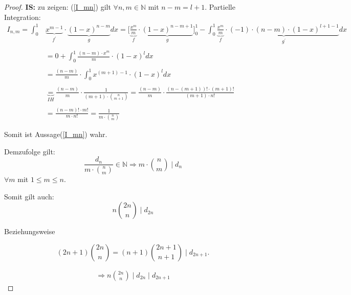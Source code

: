 \documentclass[12pt,oneside]{article}
\theoremstyle{remark}
\theoremstyle{definition}
\begin{document}
\begin{proof}
\textbf{IS:}
zu zeigen: (\ref{I_mn}) gilt $\forall n,m \in \mathbb{N}$ mit $ n - m = l + 1$.\newline\newline
Partielle Integration:\newline\newline
\begin{align*}
    I_{n,m} = \int_{0}^{1} &\underbrace{x^{m - 1}}_{f^{'}} \cdot \underbrace{(1 - x)^{n - m}}_{g} dx =\Big[ \underbrace{\frac{x^{m}}{m}}_{f} \cdot \underbrace{(1 - x)^{n - m + 1}}_{g}\Big]_0^1 - \int_{0}^{1} \underbrace{\frac{x^{m}}{m}}_{f} \cdot \underbrace{(-1 )\cdot (n - m) \cdot (1 -x)^{l + 1 - 1}}_{g^{'}} dx \\
    \\
    &= 0 +  \int_{0}^{1} \frac{(n - m) \cdot x^{m}}{m} \cdot (1 - x)^{l} dx \\
    \\
    &= \frac{(n - m )}{m} \cdot \int_{0}^{1} x^{(m + 1) - 1} \cdot (1-x)^{l} dx \\
    \\
    &\underbrace{=}_{IH} \frac{(n - m )}{m} \cdot \frac{1}{(m + 1) \cdot {n \choose m + 1}} = \frac{(n - m)}{m} \cdot \frac{(n - (m + 1))! \cdot (m + 1)!}{(m + 1) \cdot n!} \\ 
    \\ 
    &= \frac{(n - m )! \cdot m!}{m \cdot n!} = \frac{1}{m \cdot {n \choose m}} 
\end{align*}

Somit ist  Aussage(\ref{I_mn}) wahr.\newline 

Demzufolge gilt: 
\begin{equation}
    \frac{d_{n}}{m \cdot {n \choose m}} \in \mathbb{N} \Rightarrow  m \cdot {n \choose m} \mid d_{n}
\end{equation}
$\forall m $ mit $1 \leq m \leq n $.\newline

Somit gilt auch: 
\begin{equation}\label{d2n}
    n {2n\choose n} \mid d_{2n}
\end{equation}

Beziehungsweise 

\begin{equation}\label{d2n1}
    (2n + 1) {2n \choose n} = (n + 1) {2n + 1 \choose n + 1} \mid d_{2n + 1}. 
\end{equation}

\begin{align*}
\Rightarrow n {2n \choose n}\mid d_{2n}\mid d_{2n + 1}
\end{align*}
\smallskip


\end{proof}
\end{document}
